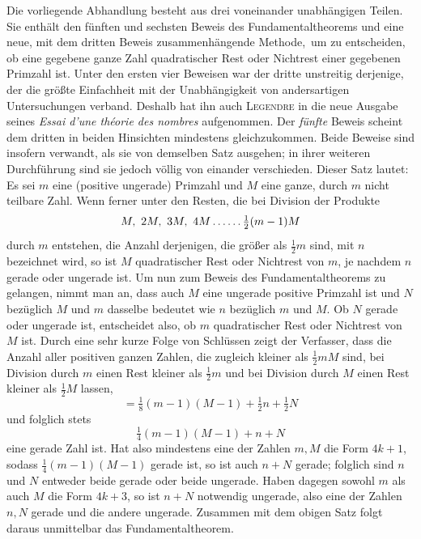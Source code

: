 Die vorliegende Abhandlung besteht aus drei voneinander unabhängigen Teilen. Sie enthält den fünften und sechsten Beweis des Fundamentaltheorems und eine neue, mit dem dritten Beweis zusammenhängende Methode,\textperiodcentered\ um zu entscheiden, ob eine gegebene ganze Zahl quadratischer Rest oder Nichtrest einer gegebenen Primzahl ist. Unter den ersten vier Beweisen war der dritte unstreitig derjenige, der die größte Einfachheit mit der Unabhängigkeit von andersartigen Untersuchungen verband. Deshalb hat ihn auch \textsc{Legendre} in die neue Ausgabe seines \emph{Essai d'une théorie des nombres} aufgenommen. Der \emph{fünfte} Beweis scheint dem dritten in beiden Hinsichten mindestens gleichzukommen. Beide Beweise sind insofern verwandt, als sie von demselben Satz ausgehen; in ihrer weiteren Durchführung sind sie jedoch völlig von%
einander verschieden. Dieser Satz lautet: Es sei $m$ eine (positive ungerade) Primzahl und $M$ eine ganze, durch $m$ nicht teilbare Zahl. Wenn ferner unter den Resten, die bei Division der Produkte
\[
M,\ 2M,\ 3M,\ 4M\mathinner{.\,.\,.\,.\,.\,.}\tfrac12(m-1)M
\]
durch $m$ entstehen, die Anzahl derjenigen, die größer als $\frac12m$ sind, mit $n$ bezeichnet wird, so ist $M$ quadratischer Rest oder Nichtrest von $m$, je nachdem $n$ gerade oder ungerade ist. Um nun zum Beweis des Fundamentaltheorems zu gelangen, nimmt man an, dass auch $M$ eine ungerade positive Primzahl ist und $N$ bezüglich $M$ und $m$ dasselbe bedeutet wie $n$ bezüglich $m$ und $M$. Ob $N$ gerade oder ungerade ist, entscheidet also, ob $m$ quadratischer Rest oder Nichtrest von $M$ ist. Durch eine sehr kurze Folge von Schlüssen zeigt der Verfasser, dass die Anzahl aller positiven ganzen Zahlen, die zugleich kleiner als $\frac12mM$ sind, bei Division durch $m$ einen Rest kleiner als $\frac12m$ und bei Division durch $M$ einen Rest kleiner als $\frac12M$ lassen,
\[
=\tfrac18(m-1)(M-1)+\tfrac12n+\tfrac12N
\]
und folglich stets
\[
\tfrac14(m-1)(M-1)+n+N
\]
eine gerade Zahl ist. Hat also mindestens eine der Zahlen $m,M$ die Form $4k+1$, sodass $\frac14(m-1)(M-1)$ gerade ist, so ist auch $n+N$ gerade; folglich sind $n$ und $N$ entweder beide gerade oder beide ungerade. Haben dagegen sowohl $m$ als auch $M$ die Form $4k+3$, so ist $n+N$ notwendig ungerade, also eine der Zahlen $n,N$ gerade und die andere ungerade. Zusammen mit dem obigen Satz folgt daraus unmittelbar das Fundamentaltheorem.

